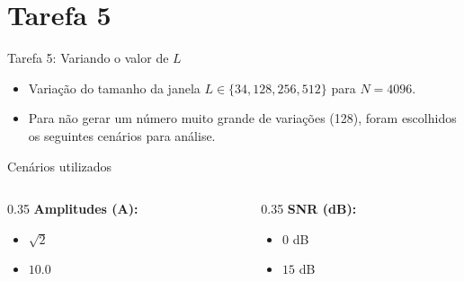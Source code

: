 \documentclass[10pt]{beamer}
\begin{document}
\section{Tarefa 5}
\begin{frame}{Tarefa 5: Variando o valor de $L$}
    \begin{itemize}
        \item Variação do tamanho da janela $L \in \{34, 128, 256, 512\}$ para $N=4096$.

        \item Para não gerar um número muito grande de variações (128), foram escolhidos os seguintes
                cenários para análise.
    \end{itemize}

    \vfill

    \begin{block}{Cenários utilizados}
        \begin{center}
            \begin{columns}
                \begin{column}{0.35\textwidth}
                    \textbf{Amplitudes (A):}
                    \begin{itemize}
                        \item $\sqrt{2}$
                        \item $10.0$
                    \end{itemize}
                \end{column}
                \begin{column}{0.35\textwidth}
                    \textbf{SNR (dB):}
                    \begin{itemize}
                        \item $0$ dB
                        \item $15$ dB
                    \end{itemize}
                \end{column}
                
            \end{columns}
        \end{center}
    \end{block}
    

\end{frame}
\end{document}
